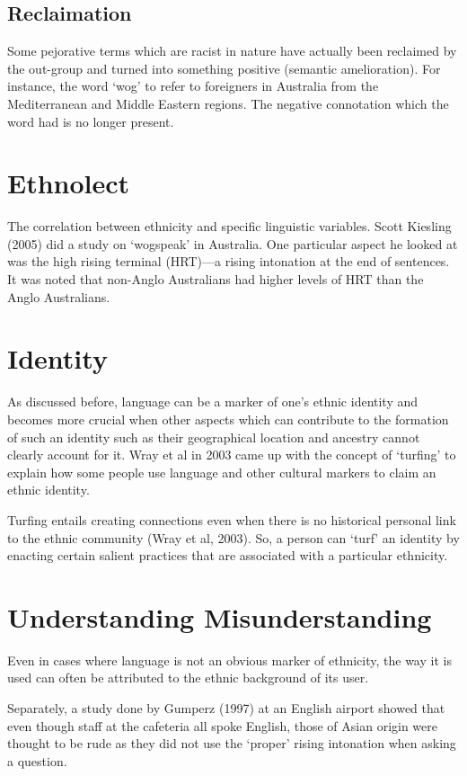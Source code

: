 \documentclass[../main.tex]{subfiles}
\begin{document}
    \subsection{Reclaimation}
    Some pejorative terms which are racist in nature have actually been reclaimed by the out-group and turned into something positive (semantic amelioration). For instance, the word `wog' to refer to foreigners in Australia from the Mediterranean and Middle Eastern regions. The negative connotation which the word had is no longer present. 

    \section{Ethnolect}
    The correlation between ethnicity and specific linguistic variables. Scott Kiesling (2005) did a study on `wogspeak' in Australia. One particular aspect he looked at was the high rising terminal (HRT)---a rising intonation at the end of sentences. It was noted that non-Anglo Australians had higher levels of HRT than the Anglo Australians.

    \section{Identity}
    As discussed before, language can be a marker of one's ethnic identity and becomes more crucial when other aspects which can contribute to the formation of such an identity such as their geographical location and ancestry cannot clearly account for it. Wray et al in 2003 came up with the concept of `turfing' to explain how some people use language and other cultural markers to claim an ethnic identity. \par

    Turfing entails creating connections even when there is no historical personal link to the ethnic community (Wray et al, 2003). So, a person can `turf' an identity by enacting certain salient practices that are associated with a particular ethnicity.

    \section{Understanding Misunderstanding}
    Even in cases where language is not an obvious marker of ethnicity, the way it is used can often be attributed to the ethnic background of its user. \par

    Separately, a study done by Gumperz (1997) at an English airport showed that even though staff at the cafeteria all spoke English, those of Asian origin were thought to be rude as they did not use the `proper' rising intonation when asking a question.
\end{document}
